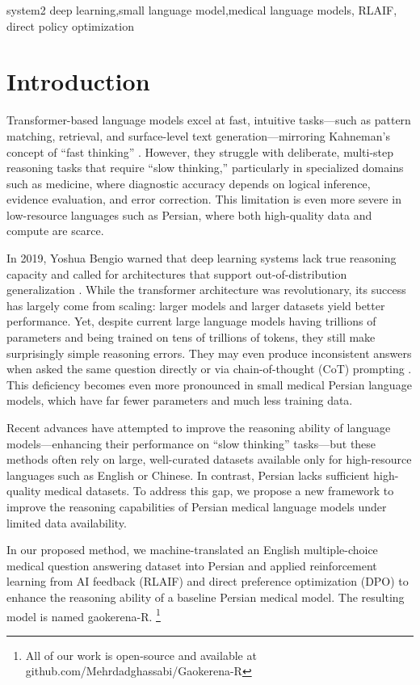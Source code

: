\documentclass[conference]{IEEEtran}
\begin{document}
	\begin{IEEEkeywords}
		system2 deep learning,small language model,medical language models, RLAIF, direct policy optimization
	\end{IEEEkeywords}
	
	\section{Introduction}

Transformer-based language models
\cite{b1} 
excel at fast, intuitive tasks—such as pattern matching, retrieval, and surface-level text generation—mirroring Kahneman’s concept of “fast thinking”
\cite{b2}.  
However, they struggle with deliberate, multi-step reasoning tasks that require “slow thinking,” particularly in specialized domains such as medicine, where diagnostic accuracy depends on logical inference, evidence evaluation, and error correction.  
This limitation is even more severe in low-resource languages such as Persian, where both high-quality data and compute are scarce.

In 2019, Yoshua Bengio warned that deep learning systems lack true reasoning capacity and called for architectures that support out-of-distribution generalization
\cite{b3}.  
While the transformer architecture was revolutionary, its success has largely come from scaling: larger models and larger datasets yield better performance.  
Yet, despite current large language models having trillions of parameters and being trained on tens of trillions of tokens, they still make surprisingly simple reasoning errors.  
They may even produce inconsistent answers when asked the same question directly or via chain-of-thought (CoT) prompting
\cite{b4}.  
This deficiency becomes even more pronounced in small medical Persian language models, which have far fewer parameters and much less training data.

Recent advances have attempted to improve the reasoning ability of language models—enhancing their performance on “slow thinking” tasks—but these methods often rely on large, well-curated datasets available only for high-resource languages such as English or Chinese.  
In contrast, Persian lacks sufficient high-quality medical datasets.  
To address this gap, we propose a new framework to improve the reasoning capabilities of Persian medical language models under limited data availability.

In our proposed method, we machine-translated an English multiple-choice medical question answering dataset into Persian and applied reinforcement learning from AI feedback (RLAIF)
\cite{b5} and direct preference optimization (DPO)
\cite{b6} to enhance the reasoning ability of a baseline Persian medical model.  
The resulting model is named gaokerena-R.
\footnote{All of our work is open-source and available at github.com/Mehrdadghassabi/Gaokerena-R}
\end{document}
